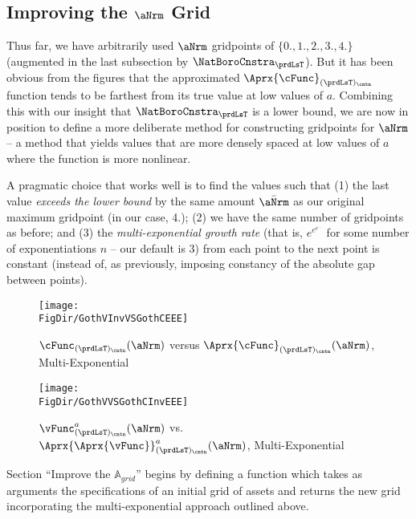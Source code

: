 \documentclass[\econtexRoot/SolvingMicroDSOPs]{subfiles}
\begin{document}

\hypertarget{improving-the-a-grid}{}
\subsection{Improving the $\aNrm$ Grid}\label{subsec:improving-the-a-grid}

Thus far, we have arbitrarily used $\aNrm$ gridpoints of $\{0.,1.,2.,3.,4.\}$ (augmented in the last subsection by $\NatBoroCnstra_{\prdLsT}$).  But it has been obvious from the figures that the approximated $\Aprx{\cFunc}_{(\prdLsT)_\cntn}$ function tends to be farthest from its true value at low values of $a$.  Combining this with our insight that $\NatBoroCnstra_{\prdLsT}$ is a lower bound, we are now in position to define a more deliberate method for constructing gridpoints for $\aNrm$ -- a method that yields values that are more densely spaced at low values of $a$ where the function is more nonlinear.

A pragmatic choice that works well is to find the values such that (1) the last value \textit{exceeds the lower bound} by the same amount $\bar\aNrm$ as our original maximum gridpoint (in our case, 4.); (2) we have the same number of gridpoints as before; and (3) the \textit{multi-exponential growth rate} (that is, $e^{e^{e^{...}}}$ for some number of exponentiations $n$ -- our default is 3) from each point to the next point is constant (instead of, as previously, imposing constancy of the absolute gap between points).

\hypertarget{GothVInvVSGothCEEE}{}
\begin{figure}
  \centerline{\texttt{[image: \\FigDir/GothVInvVSGothCEEE]}}
  \caption{$\cFunc_{(\prdLsT)_\cntn}(\aNrm)$ versus
    $\Aprx{\cFunc}_{(\prdLsT)_\cntn}(\aNrm)$, Multi-Exponential }
  \label{fig:GothVInvVSGothCEE}
\end{figure}


\hypertarget{GothVVSGothCInvEEE}{}
\begin{figure}
  \texttt{[image: \\FigDir/GothVVSGothCInvEEE]}
  \caption{$\vFunc^{a}_{(\prdLsT)_\cntn}(\aNrm)$ vs.
    $\Aprx{\Aprx{\vFunc}}_{(\prdLsT)_\cntn}^{a}(\aNrm)$, Multi-Exponential }
  \label{fig:GothVVSGothCInvEE}
\end{figure}

Section ``Improve the $\mathbb{A}_{grid}$'' begins by defining a function which takes as arguments the specifications of an initial grid of assets and returns the new grid incorporating the multi-exponential approach outlined above.
\end{document}
